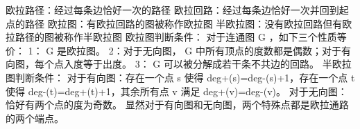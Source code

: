 \markdownRendererSectionEnd 
\markdownRendererSectionEnd \markdownRendererSectionBegin
{}\markdownRendererInterblockSeparator
{}欧拉路径：经过每条边恰好一次的路径\markdownRendererParagraphSeparator
{}欧拉回路：经过每条边恰好一次并回到起点的路径\markdownRendererParagraphSeparator
{}欧拉图：有欧拉回路的图被称作欧拉图\markdownRendererParagraphSeparator
{}半欧拉图：没有欧拉回路但有欧拉路径的图被称作半欧拉图\markdownRendererParagraphSeparator
{}欧拉图判断条件：\markdownRendererParagraphSeparator
{}对于连通图\markdownRendererDollarSign{} G \markdownRendererDollarSign{}，如下三个性质等价：\markdownRendererParagraphSeparator
{}1：\markdownRendererDollarSign{} G \markdownRendererDollarSign{}是欧拉图。\markdownRendererParagraphSeparator
{}2：对于无向图，\markdownRendererDollarSign{} G \markdownRendererDollarSign{}中所有顶点的度数都是偶数；对于有向图，每个点入度等于出度。\markdownRendererParagraphSeparator
{}3：\markdownRendererDollarSign{} G \markdownRendererDollarSign{}可以被分解成若干条不共边的回路。\markdownRendererParagraphSeparator
{}半欧拉图判断条件：\markdownRendererParagraphSeparator
{}对于有向图：存在一个点 \markdownRendererDollarSign{}s\markdownRendererDollarSign{} 使得 \markdownRendererDollarSign{}\markdownRendererBackslash{}deg\markdownRendererCircumflex{}\markdownRendererLeftBrace{}+\markdownRendererRightBrace{}(s)=\markdownRendererBackslash{}deg\markdownRendererCircumflex{}\markdownRendererLeftBrace{}-\markdownRendererRightBrace{}(s)+1\markdownRendererDollarSign{}，存在一个点 \markdownRendererDollarSign{}t\markdownRendererDollarSign{} 使得 \markdownRendererDollarSign{}\markdownRendererBackslash{}deg\markdownRendererCircumflex{}\markdownRendererLeftBrace{}-\markdownRendererRightBrace{}(t)=\markdownRendererBackslash{}deg\markdownRendererCircumflex{}\markdownRendererLeftBrace{}+\markdownRendererRightBrace{}(t)+1\markdownRendererDollarSign{}，其余所有点 \markdownRendererDollarSign{}v\markdownRendererDollarSign{} 满足 \markdownRendererDollarSign{}\markdownRendererBackslash{}deg\markdownRendererCircumflex{}\markdownRendererLeftBrace{}+\markdownRendererRightBrace{}(v)=\markdownRendererBackslash{}deg\markdownRendererCircumflex{}\markdownRendererLeftBrace{}-\markdownRendererRightBrace{}(v)\markdownRendererDollarSign{}。\markdownRendererParagraphSeparator
{}对于无向图：恰好有两个点的度为奇数。\markdownRendererParagraphSeparator
{}显然对于有向图和无向图，两个特殊点都是欧拉通路的两个端点。\markdownRendererInterblockSeparator
{}\markdownRendererSectionBegin
{}\markdownRendererInterblockSeparator
